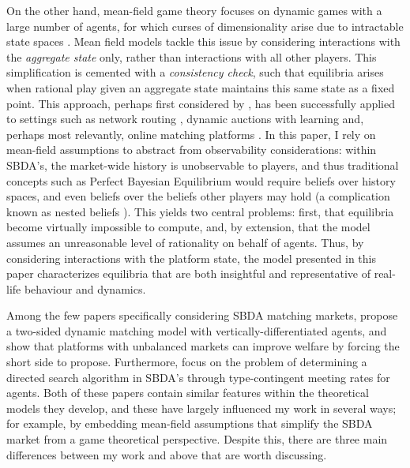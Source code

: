 On the other hand, mean-field game theory focuses on dynamic games with a large number of agents, for which curses of dimensionality arise due to intractable state spaces \citep{light2022mean}. Mean field models tackle this issue by considering interactions with the \textit{aggregate state} only, rather than interactions with all other players.
This simplification is cemented with a \textit{consistency check}, such that equilibria arises when rational play given an aggregate state maintains this same state as a fixed point. 
This approach, perhaps first considered by \cite{jovanovic1988anonymous}, has been successfully applied to settings such as network routing \citep{calderone2017markov}, dynamic auctions with learning \citep{iyer2014mean} and, perhaps most relevantly, online matching platforms \citep{kanoria2021facilitating,immorlica2021designing}.
In this paper, I rely on mean-field assumptions to abstract from observability considerations: within SBDA's, the market-wide history is unobservable to players, and thus traditional concepts such as Perfect Bayesian Equilibrium would require beliefs over history spaces, and even beliefs over the beliefs other players may hold (a complication known as nested beliefs \citep{brandenburger1993hierarchies}).
This yields two central problems: first, that equilibria become virtually impossible to compute, and, by extension, that the model assumes an unreasonable level of rationality on behalf of agents.
Thus, by considering interactions with the platform state, the model presented in this paper characterizes equilibria that are both insightful and representative of real-life behaviour and dynamics.


Among the few papers specifically considering SBDA matching markets, \cite{kanoria2021facilitating} propose a two-sided dynamic matching model with vertically-differentiated agents, and show that platforms with unbalanced markets can improve welfare by forcing the short side to propose. Furthermore, \cite{immorlica2021designing} focus on the problem of determining a directed search algorithm in SBDA's through type-contingent meeting rates for agents. Both of these papers contain similar features within the theoretical models they develop, and these have largely influenced my work in several ways; for example, by embedding mean-field assumptions that simplify the SBDA market from a game theoretical perspective. Despite this, there are three main differences between my work and above that are worth discussing. 


